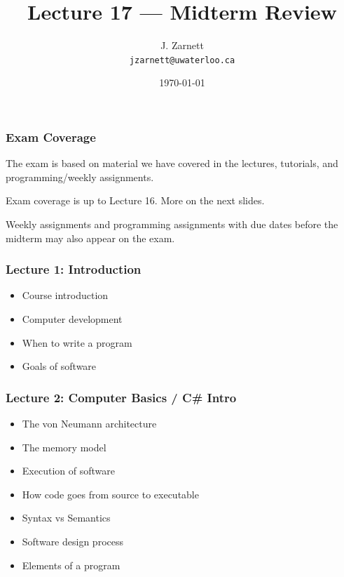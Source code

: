 

\title{Lecture 17 --- Midterm Review }

\author{J. Zarnett\\
\texttt{jzarnett@uwaterloo.ca}}
\date{\today}



\begin{frame}
  \titlepage
  
 \end{frame}




\begin{frame}
\frametitle{Exam Coverage}

The exam is based on material we have covered in the lectures, tutorials, and programming/weekly assignments.

Exam coverage is up to Lecture 16. More on the next slides.

Weekly assignments and programming assignments with due dates before the midterm may also appear on the exam. 

\end{frame}


\begin{frame}
\frametitle{Lecture 1: Introduction}

{\Large
\begin{itemize}
	\item Course introduction
	\item Computer development
	\item When to write a program
	\item Goals of software
\end{itemize}
}
\end{frame}

\begin{frame}
\frametitle{Lecture 2: Computer Basics / C\# Intro}

{\Large
\begin{itemize}
	\item The von Neumann architecture
	\item The memory model
	\item Execution of software
	\item How code goes from source to executable
	\item Syntax vs Semantics
	\item Software design process
	\item Elements of a program
\end{itemize}
}

\end{frame}



